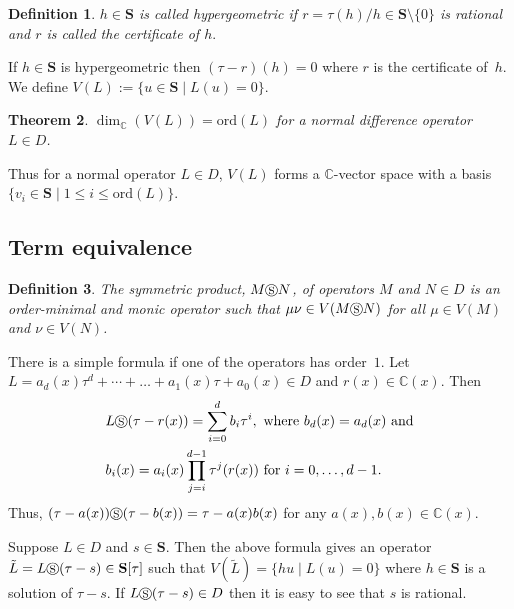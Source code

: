 \documentclass{article}
\newtheorem{theorem}{Theorem}[section]
\newtheorem{definition}[theorem]{Definition}
\newcommand{\C}{{\mathbb{C}}} \newcommand{\N}{{\mathbb{N}}}
\newcommand{\ord}{\mathrm{ord}}
\newcommand{\cS}{\circledS}
\newcommand{\Seq}{\mathbf{S}}
\begin{document}
\begin{definition}
$h \in \Seq$ is called hypergeometric if $r=\tau(h)/h \in \Seq \setminus \{0\}$ is rational and 
$r$ is called the certificate of $h.$
\end{definition}
If $h \in \Seq$ is hypergeometric then $(\tau-r)(h)=0$ where $r$ is the certificate of~$h$.
We define $V(L):=\{ u\in \mathbf{S} \mid L(u)=0 \}$.

\begin{theorem}\cite[Theorem 8.2.1]{AeqB}
$\dim_\C(V(L))=\ord(L)$ for a normal difference
operator $L \in D$. 
\end{theorem}

Thus for a normal operator $L \in D$, $V(L)$ forms a $\C$-vector space 
with a basis $\{ v_i \in \Seq \mid 1 \leq i \leq \ord(L) \}$.






\subsection{Term equivalence}\label{sec:sp}

\begin{definition}\label{def:sp}
  The symmetric product, $M \circledS N$, of operators $M$ and $N \in D$ is an
  order-minimal and monic operator such that $\mu \nu \in V(M \circledS N)$ for all $\mu
  \in V(M)$ and $\nu \in V(N)$. 
\end{definition}

There is a simple formula if one of the operators has order~$1$.  Let $L
=a_d(x)\tau^d+\cdots+\dots+a_1(x)\tau+a_0(x) \in D$ and $r(x) \in \C(x)$. Then
\begin{equation}
\label{sym}
\begin{split}
& L \circledS (\tau-r(x))=\displaystyle \sum_{i=0}^d b_i \tau^i, \ \text{where} \ b_d(x)=a_d(x) \ \text{and}\\
& b_i(x)=a_i(x)\displaystyle\prod_{j=i}^{d-1} \tau^j(r(x)) \ \text{for} \ i=0,\ldots,d-1.
\end{split}
\end{equation}
Thus, $(\tau-a(x)) \circledS (\tau-b(x)) =\tau-a(x)b(x)$ for any $a(x), b(x) \in \C(x)$.


Suppose $L \in D$ and $s \in \Seq$. Then the above formula gives an operator $\tilde{L}=L \cS (\tau-s) \in \Seq[\tau]$ such that $V(\tilde{L})=\{ hu \mid L(u)=0 \}$ 
where $h \in \Seq$ is a solution of $\tau-s$. If $L \cS (\tau-s) \in D$ then it is easy to see that $s$ is rational.
\end{document}
